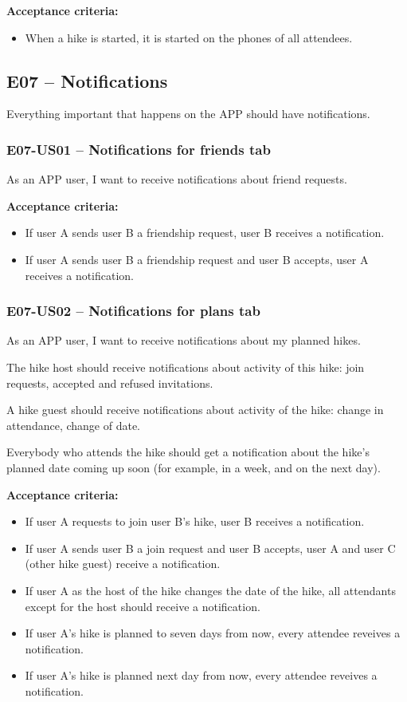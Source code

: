 \textbf{Acceptance criteria:}
\begin{itemize}
    \item When a hike is started, it is started on the phones of all attendees.
\end{itemize}

\subsection*{E07 -- Notifications}
Everything important that happens on the APP should have notifications.

\subsubsection*{E07-US01 -- Notifications for friends tab}
As an APP user, I want to receive notifications about friend requests.

\textbf{Acceptance criteria:}
\begin{itemize}
    \item If user A sends user B a friendship request, user B receives a notification.
    \item If user A sends user B a friendship request and user B accepts, user A receives a notification.
\end{itemize}

\subsubsection*{E07-US02 -- Notifications for plans tab}
As an APP user, I want to receive notifications about my planned hikes.

The hike host should receive notifications about activity of this hike: join requests, accepted and refused invitations.

A hike guest should receive notifications about activity of the hike: change in attendance, change of date.

Everybody who attends the hike should get a notification about the hike's planned date coming up soon (for example, in a week, and on the next day).

\textbf{Acceptance criteria:}
\begin{itemize}
    \item If user A requests to join user B's hike, user B receives a notification.
    \item If user A sends user B a join request and user B accepts, user A and user C (other hike guest) receive a notification.
    \item If user A as the host of the hike changes the date of the hike, all attendants except for the host should receive a notification.
    \item If user A's hike is planned to seven days from now, every attendee reveives a notification.
    \item If user A's hike is planned next day from now, every attendee reveives a notification.
\end{itemize}


